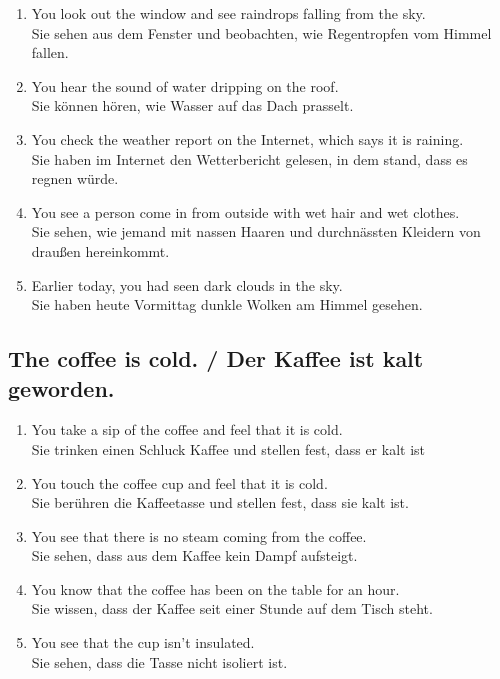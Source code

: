 \documentclass[11pt]{article}
\begin{document}
\begin{enumerate}
	\item You look out the window and see raindrops falling from the sky. \\ Sie sehen aus dem Fenster und beobachten, wie Regentropfen vom Himmel fallen. 
	\item You hear the sound of water dripping on the roof. \\ Sie können hören, wie Wasser auf das Dach prasselt.
	\item You check the weather report on the Internet, which says it is raining. \\ Sie haben im Internet den Wetterbericht gelesen, in dem stand, dass es regnen würde. 
	\item You see a person come in from outside with wet hair and wet clothes. \\ Sie sehen, wie jemand mit nassen Haaren und durchnässten Kleidern von draußen hereinkommt.
	\item Earlier today, you had seen dark clouds in the sky. \\ Sie haben heute Vormittag dunkle Wolken am Himmel gesehen.
\end{enumerate}

\subsection{The coffee is cold. / Der Kaffee ist kalt geworden.}

\begin{enumerate} 
	\item You take a sip of the coffee and feel that it is cold. \\
	Sie trinken einen Schluck Kaffee und stellen fest, dass er kalt ist
	\item You touch the coffee cup and feel that it is cold.\\
	Sie berühren die Kaffeetasse und stellen fest, dass sie kalt ist.
	\item You see that there is no steam coming from the coffee.\\
	Sie sehen, dass aus dem Kaffee kein Dampf aufsteigt.
	\item You know that the coffee has been on the table for an hour.\\
	Sie wissen, dass der Kaffee seit einer Stunde auf dem Tisch steht.
	\item You see that the cup isn't insulated.\\
	Sie sehen, dass die Tasse nicht isoliert ist.
\end{enumerate}
\end{document}
